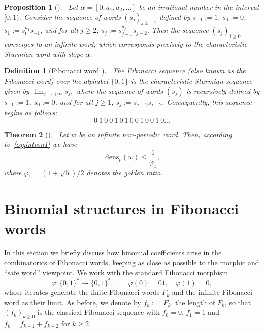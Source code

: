 \documentclass[12pt]{amsart}
\newtheorem{theorem}{Theorem}[section]
\newtheorem{proposition}[theorem]{Proposition}
\newtheorem{definition}{Definition}
\begin{document}
\begin{proposition}[\cite{Adamczewski2007,Allouche2003}]~\label{proirrationaln1}
Let $\alpha = [0, a_1, a_2, \dots]$ be an irrational number in the interval $[0,1)$. Consider the sequence of words $(s_j)_{j \geq -1}$ defined by $s_{-1} := 1$, $s_0 := 0$, $s_1 := s_0^{a_1} s_{-1}$, and for all $j \geq 2$, $s_j := s_{j-1}^{a_j} s_{j-2}.$
Then the sequence $(s_j)_{j \geq 0}$ converges to an infinite word, which corresponds precisely to the characteristic Sturmian word with slope $\alpha$.
\end{proposition}

\begin{definition}[Fibonacci word \cite{Adamczewski2007}]~\label{defffFibonaccin`}
The \emph{Fibonacci sequence} (also known as the Fibonacci word) over the alphabet $\{0,1\}$ is the characteristic Sturmian sequence given by $\lim_{j \to +\infty} s_j,$
where the sequence of words $(s_j)$ is recursively defined by $s_{-1} := 1$, $s_0 := 0$, and for all $j \geq 1$, $s_j := s_{j-1} s_{j-2}.$
Consequently, this sequence begins as follows:
\[
0\ 1\ 0\ 0\ 1\ 0\ 1\ 0\ 0\ 1\ 0\ 0\ 1\ 0 \ldots
\]
\end{definition}

\begin{theorem}[\cite{Fischler2013}]~\label{ThmplinDENSN1}
 Let $w$ be an infinite non-periodic word. Then, according to~\eqref{eqqintron1} we have
\begin{equation}~\label{eq1ThmplinDENSN1}
\mathrm{dens}_p(w) \leq \frac{1}{\varphi_1},
\end{equation}
where $\varphi_1=(1+\sqrt{5})/2$ denotes the golden ratio.
\end{theorem}
\section{Binomial structures in Fibonacci words}\label{sec:Binomial}

In this section we briefly discuss how binomial coefficients arise in the combinatorics of Fibonacci words, keeping as close as possible to the morphic and ``safe word'' viewpoint. We work with the standard Fibonacci morphism
\[
\varphi : \{0,1\}^* \to \{0,1\}^*,\qquad \varphi(0)=01,\quad \varphi(1)=0,
\]
whose iterates generate the finite Fibonacci words $F_k$ and the infinite Fibonacci word as their limit. As before, we denote by $f_k:=|F_k|$ the length of $F_k$, so that $(f_k)_{k\ge 0}$ is the classical Fibonacci sequence with $f_0=0$, $f_1=1$ and $f_k=f_{k-1}+f_{k-2}$ for $k\ge 2$.
\end{document}
